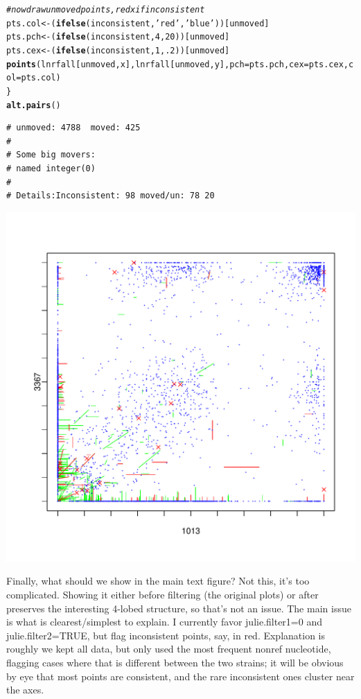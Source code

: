 \documentclass{article}\usepackage[]{graphicx}\usepackage[]{color}
\makeatletter
\newcommand{\hlnum}[1]{\textcolor[rgb]{0.686,0.059,0.569}{#1}}%
\newcommand{\hlstr}[1]{\textcolor[rgb]{0.192,0.494,0.8}{#1}}%
\newcommand{\hlcom}[1]{\textcolor[rgb]{0.678,0.584,0.686}{\textit{#1}}}%
\newcommand{\hlstd}[1]{\textcolor[rgb]{0.345,0.345,0.345}{#1}}%
\newcommand{\hlkwb}[1]{\textcolor[rgb]{0.69,0.353,0.396}{#1}}%
\newcommand{\hlkwc}[1]{\textcolor[rgb]{0.333,0.667,0.333}{#1}}%
\newcommand{\hlkwd}[1]{\textcolor[rgb]{0.737,0.353,0.396}{\textbf{#1}}}%
\newenvironment{kframe}{%
 \def\at@end@of@kframe{}%
 \ifinner\ifhmode%
  \def\at@end@of@kframe{\end{minipage}}%
  \begin{minipage}{\columnwidth}%
 \fi\fi%
 \def\FrameCommand##1{\hskip\@totalleftmargin \hskip-\fboxsep
 \colorbox{shadecolor}{##1}\hskip-\fboxsep
     \hskip-\linewidth \hskip-\@totalleftmargin \hskip\columnwidth}%
 \MakeFramed {\advance\hsize-\width
   \@totalleftmargin\z@ \linewidth\hsize
   \@setminipage}}%
 {\par\unskip\endMakeFramed%
 \at@end@of@kframe}
\newenvironment{knitrout}{}{} %
\makeatother
\begin{document}
\begin{knitrout}
\begin{kframe}
\begin{alltt}
  \hlcom{# now draw unmoved points, red x if inconsistent}
  \hlstd{pts.col} \hlkwb{<-} \hlstd{(}\hlkwd{ifelse}\hlstd{(inconsistent,}\hlstr{'red'}\hlstd{,}\hlstr{'blue'}\hlstd{))[unmoved]}
  \hlstd{pts.pch} \hlkwb{<-} \hlstd{(}\hlkwd{ifelse}\hlstd{(inconsistent,}\hlnum{4}\hlstd{,}\hlnum{20}\hlstd{))[unmoved]}
  \hlstd{pts.cex} \hlkwb{<-} \hlstd{(}\hlkwd{ifelse}\hlstd{(inconsistent,}\hlnum{1}\hlstd{,}\hlnum{.2}\hlstd{))[unmoved]}
  \hlkwd{points}\hlstd{(lnrfall[unmoved,x], lnrfall[unmoved,y],} \hlkwc{pch}\hlstd{=pts.pch,} \hlkwc{cex}\hlstd{=pts.cex,} \hlkwc{col}\hlstd{=pts.col)}
\hlstd{\}}
\hlkwd{alt.pairs}\hlstd{()}
\end{alltt}
\begin{verbatim}
# unmoved: 4788  moved: 425 
# 
# Some big movers:
# named integer(0)
# 
# Details:Inconsistent: 98 moved/un: 78 20
\end{verbatim}
\end{kframe}
\includegraphics[width=7in]{Fig1-mscat-figs/unnamed-chunk-45-1} 

\end{knitrout}

Finally, what should we show in the main text figure?  Not this, it's too complicated.  Showing it either before filtering (the original plots) or after preserves the interesting 4-lobed structure, so that's not an issue.  The main issue is what is clearest/simplest to explain.  I currently favor julie.filter1=0 and julie.filter2=TRUE, but flag inconsistent points, say, in red.  Explanation is roughly we kept all data, but only used the most frequent nonref nucleotide, flagging cases where that is different between the two strains; it will be obvious by eye that most points are consistent, and the rare inconsistent ones cluster near the axes.
\end{document}
